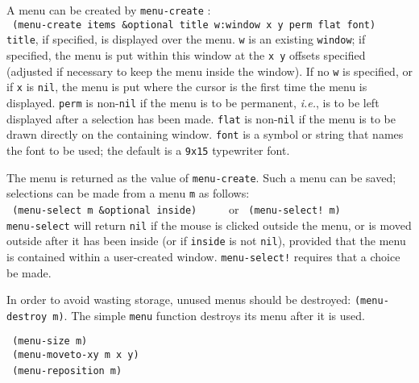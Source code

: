 A menu can be created by {\tt menu-create} : \\

\vspace{-0.1in}
{\tt \hspace*{0.5in}
 (menu-create items \&optional title w:window x y perm flat font)} \\

\vspace{-0.1in}
{\tt title}, if specified, is displayed over the menu.
{\tt w} is an existing {\tt window}; if specified, the menu is put
within this window at the {\tt x y} offsets specified (adjusted if necessary
to keep the menu inside the window).  If no {\tt w}
is specified, or if {\tt x} is {\tt nil}, the menu is put where the cursor
is the first time the menu is displayed.
{\tt perm} is non-{\tt nil} if the menu is to be permanent, {\em i.e.}, is to
be left displayed after a selection has been made.
{\tt flat} is non-{\tt nil} if the menu is to be drawn directly on the
containing window.
{\tt font} is a symbol or string that names the font to be used; the
default is a {\tt 9x15} typewriter font.

The menu is returned as the value of {\tt menu-create}.  Such a menu can
be saved; selections can be made from a menu {\tt m} as follows: \\

\vspace{-0.1in}
{\tt \hspace*{0.5in} (menu-select m \&optional inside)} \ \ \ \ \ or
{\tt \hspace*{0.5in} (menu-select! m)} \\

\vspace{-0.1in}
{\tt menu-select} will return {\tt nil} if the mouse is clicked outside the
menu, or is moved outside after it has been inside (or if {\tt inside} is
not {\tt nil}), provided that the menu is contained within a user-created
window.
{\tt menu-select!} requires that a choice be made.

In order to avoid wasting storage, unused menus should be destroyed:
{\tt (menu-destroy m)}.  The simple {\tt menu} function destroys its
menu after it is used.

{\tt \hspace*{0.5in} (menu-size m)} \\
{\tt \hspace*{0.5in} (menu-moveto-xy m x y)} \\
{\tt \hspace*{0.5in} (menu-reposition m)} \

